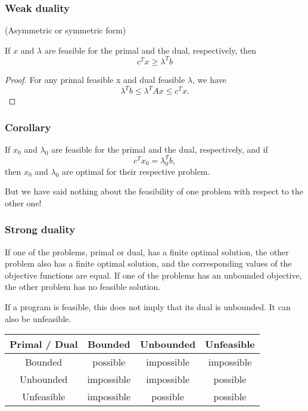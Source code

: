\documentclass{beamer}
\begin{document}
\begin{frame}
	\frametitle{Weak duality}
	
	(Asymmetric or symmetric form)
	
	\mbox{}
	
	If $x$ and $\lambda$ are feasible for the primal and the dual, respectively, then
	\[
	c^T x \geq \lambda^T b
	\]
	
	\begin{proof}
		For any primal feasible x and dual feasible $\lambda$, we have
		\[
		\lambda^T b \leq \lambda^TAx \leq c^Tx.
		\]
	\end{proof}
	
\end{frame}

\begin{frame}
	\frametitle{Corollary}
	
	If $x_0$ and $\lambda_0$ are feasible for the primal and the dual, respectively, and if
	\[
	c^T x_0 = \lambda_0^T b,
	\]
	then $x_0$ and $\lambda_0$ are optimal for their respective problem.
	
	\mbox{}
	
	But we have said nothing about the feasibility of one problem with respect to the other one!
	
\end{frame}

\begin{frame}
	\frametitle{Strong duality}
	
	If one of the problems, primal or dual, has a finite optimal solution, the other problem also has a finite optimal solution, and the corresponding values of the objective functions are equal.
	If one of the problems has an unbounded objective, the other problem has no feasible solution.

\mbox{}

If a program is feasible, this does not imply that its dual is unbounded. It can also be unfeasible.

\mbox{}

\begin{center}
	\begin{tabular}{|c||c|c|c|}
		\hline
		Primal / Dual & Bounded & Unbounded & Unfeasible \\
		\hline
		\hline
		Bounded & possible & impossible & impossible \\
		\hline
		Unbounded & impossible & impossible & possible \\
		\hline
		Unfeasible & impossible & possible & possible \\
		\hline
	\end{tabular}
\end{center}

\end{frame}
\end{document}
